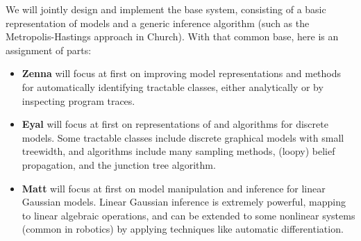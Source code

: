 \documentclass{article}
\begin{document}
    We will jointly design and implement the base system, consisting of a basic
    representation of models and a generic inference algorithm (such as the
    Metropolis-Hastings approach in Church). With that common base, here is an
    assignment of parts:
    \begin{itemize}
    \item \textbf{Zenna} will focus at first on improving model representations
        and methods for automatically identifying tractable classes, either
        analytically or by inspecting program traces.
    \item \textbf{Eyal} will focus at first on representations of and
        algorithms for discrete models. Some tractable classes include discrete
        graphical models with small treewidth, and algorithms include many
        sampling methods, (loopy) belief propagation, and the junction tree
        algorithm.
    \item \textbf{Matt} will focus at first on model manipulation and inference
        for linear Gaussian models. Linear Gaussian inference is extremely
        powerful, mapping to linear algebraic operations, and can be extended
        to some nonlinear systems (common in robotics) by applying techniques
        like automatic differentiation.
    \end{itemize}

    
    
\end{document}
